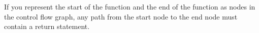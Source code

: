 If you represent the start of the function and the end of the function as nodes in the control flow
graph, any path from the start node to the end node must contain a return statement.